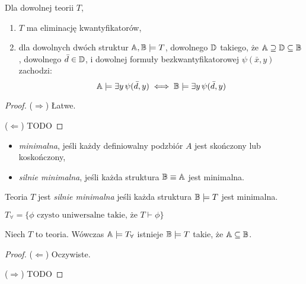 \documentclass{article}
\begin{document}
\begin{tw}
Dla dowolnej teorii $T$, \fae
	\begin{enumerate}
		\item $T$ ma eliminację kwantyfikatorów,
		\item dla dowolnych dwóch struktur $\mathbb{A}, \mathbb{B} \models T$, dowolnego $\mathbb{D}$ takiego, że $\mathbb{A} \supseteq \mathbb{D} \subseteq \mathbb{B}$,  dowolnego $\bar{d} \in \mathbb{D}$, i dowolnej formuły bezkwantyfikatorowej $\psi(\bar{x}, y)$  zachodzi:
			\[\mathbb{A} \models \exists y \, \psi(\bar{d}, y) \iff \mathbb{B} \models \exists y \, \psi(\bar{d}, y)\]
	\end{enumerate}
\end{tw}
\begin{proof}
	($\Rightarrow$) Łatwe.

	($\Leftarrow$) \color{red} TODO
\end{proof}

\begin{df}
	\begin{itemize}
		Struktura $\A$ jest:
		\item \textit{minimalna}, jeśli każdy definiowalny podzbiór $A$ jest skończony lub koskończony,
		\item \textit{silnie minimalna}, jeśli każda struktura $\mathbb{B} \equiv \mathbb{A}$ jest minimalna.
	\end{itemize}

	Teoria $T$ jest \textit{silnie minimalna} jeśli każda struktura $\mathbb{B} \models T$ jest minimalna.
\end{df}


\begin{df}
	$T_{\forall} = \{\phi \text{ czysto uniwersalne takie, że } T \vdash
	\phi\}$
\end{df}

\begin{stw}
	Niech $T$ to teoria.
	Wówczas $\mathbb{A} \models T_{\forall}$ \wtw istnieje $\mathbb{B} \models T$ takie, że $\mathbb{A} \subseteq \mathbb{B}$.
\end{stw}
\begin{proof}
	($\Leftarrow$) Oczywiste.

		($\Rightarrow$) \color{red} TODO
\end{proof}
\end{document}
